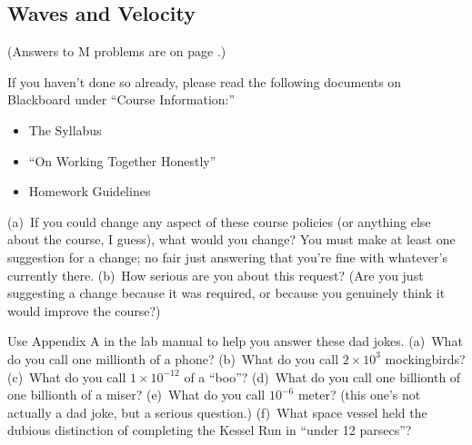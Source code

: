 \subsection{Waves and Velocity} 

(Answers to M problems are on page \pageref{waves_and_velocity_prob_answers}.)

\begin{Exercise}
If you haven't done so already, please read the following documents on Blackboard under ``Course Information:''
\begin{itemize}[nosep]
\item The Syllabus
\item ``On Working Together Honestly''
\item Homework Guidelines
\end{itemize}
(a)~If you could change any aspect of these course policies (or anything else about the course, I guess), what would you change?  You must make at least one suggestion for a change; no fair just answering that you're fine with whatever's currently there.  (b)~How serious are you about this request?  (Are you just suggesting a change because it was required, or because you genuinely think it would improve the course?)
\end{Exercise}

\begin{Exercise}[difficulty=1]
Use Appendix A in the lab manual to help you answer these dad jokes.  (a)~What do you call one millionth of a phone?  (b)~What do you call $2 \times 10^3$ mockingbirds? (c)~What do you call $1 \times 10^{-12}$ of a ``boo''?  (d)~What do you call one billionth of one billionth of a miser?  (e)~What do you call $10^{-6}$ meter? (this one's not actually a dad joke, but a serious question.) (f)~What space vessel held the dubious distinction of completing the Kessel Run in ``under 12 parsecs''?
\end{Exercise}

